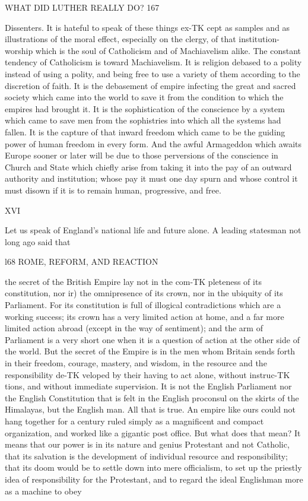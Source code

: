 \documentclass[12pt,a5paper,oneside]{book}
\begin{document}
{WHAT DID LUTHER REALLY DO? 167 

Dissenters. It is hateful to speak of these things ex-TK
cept as samples and as illustrations of the moral effect, 
especially on the clergy, of that institution-worship 
which is the soul of Catholicism and of Machiavelism 
alike. The constant tendency of Catholicism is 
toward Machiavelism. It is religion debased to a 
polity instead of using a polity, and being free to use 
a variety of them according to the discretion of faith. 
It is the debasement of empire infecting the great and 
sacred society which came into the world to save it 
from the condition to which the empires had brought it. 
It is the sophistication of the conscience by a system 
which came to save men from the sophistries into 
which all the systems had fallen. It is the capture 
of that inward freedom which came to be the guiding 
power of human freedom in every form. And the 
awful Armageddon which awaits Europe sooner or 
later will be due to those perversions of the conscience 
in Church and State which chiefly arise from taking it 
into the pay of an outward authority and institution; 
whose pay it must one day spurn and whose control 
it must disown if it is to remain human, progressive, 
and free. 

XVI 

Let us speak of England's national life and future 
alone. A leading statesman not long ago said that 



l68 ROME, REFORM, AND REACTION 

the secret of the British Empire lay not in the com-TK
pleteness of its constitution, nor ir) the omnipresence 
of its crown, nor in the ubiquity of its Parliament. 
For its constitution is full of illogical contradictions 
which are a working success; its crown has a very 
limited action at home, and a far more limited action 
abroad (except in the way of sentiment); and the 
arm of Parliament is a very short one when it is a 
question of action at the other side of the world. 
But the secret of the Empire is in the men whom 
Britain sends forth in their freedom, courage, mastery, 
and wisdom, in the resource and the responsibility de-TK
veloped by their having to act alone, without instruc-TK
tions, and without immediate supervision. It is not 
the English Parliament nor the English Constitution 
that is felt in the English proconsul on the skirts of 
the Himalayas, but the English man. All that is true. 
An empire like ours could not hang together for a 
century ruled simply as a magnificent and compact 
organization, and worked like a gigantic post office. 
But what does that mean? It means that our power 
is in its nature and genius Protestant and not Catholic, 
that its salvation is the development of individual 
resource and responsibility; that its doom would be to 
settle down into mere officialism, to set up the priestly 
idea of responsibility for the Protestant, and to regard 
the ideal Englishman more as a machine to obey 



}
\end{document}
